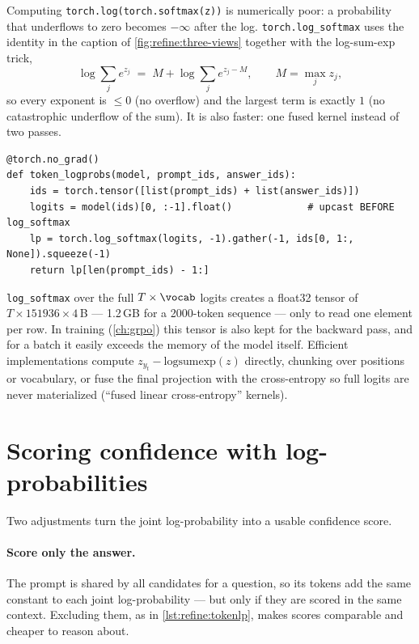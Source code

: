 Computing \texttt{torch.log(torch.softmax(z))} is numerically poor: a probability that underflows to
zero becomes $-\infty$ after the log. \texttt{torch.log\_softmax} uses the identity in the caption of
\cref{fig:refine:three-views} together with the log-sum-exp trick,
\begin{equation}
  \log \sum_j e^{z_j} \;=\; M + \log \sum_j e^{z_j - M}, \qquad M = \max_j z_j,
  \label{eq:refine:lse}
\end{equation}
so every exponent is $\le 0$ (no overflow) and the largest term is exactly $1$ (no catastrophic
underflow of the sum). It is also faster: one fused kernel instead of two passes.

\begin{lstlisting}[caption={Per-token log-probabilities in one pass (\texttt{llmsys/tts.py}).},label={lst:refine:tokenlp}]
@torch.no_grad()
def token_logprobs(model, prompt_ids, answer_ids):
    ids = torch.tensor([list(prompt_ids) + list(answer_ids)])
    logits = model(ids)[0, :-1].float()             # upcast BEFORE log_softmax
    lp = torch.log_softmax(logits, -1).gather(-1, ids[0, 1:, None]).squeeze(-1)
    return lp[len(prompt_ids) - 1:]
\end{lstlisting}

\begin{systemslens}
\texttt{log\_softmax} over the full $T \times \vocab$ logits creates a float32 tensor of
$T \times \num{151936} \times 4$\,B --- 1.2\,GB for a 2000-token sequence --- only to read one element
per row. In training (\cref{ch:grpo}) this tensor is also kept for the backward pass, and for a batch
it easily exceeds the memory of the model itself. Efficient implementations compute
$z_{y_t} - \mathrm{logsumexp}(z)$ directly, chunking over positions or vocabulary, or fuse the final
projection with the cross-entropy so full logits are never materialized (``fused linear
cross-entropy'' kernels).
\end{systemslens}

\section{Scoring confidence with log-probabilities}\label{sec:refine:confidence}

Two adjustments turn the joint log-probability into a usable confidence score.

\paragraph{Score only the answer.} The prompt is shared by all candidates for a question, so its
tokens add the same constant to each joint log-probability --- but only if they are scored in the
same context. Excluding them, as in \cref{lst:refine:tokenlp}, makes scores comparable and cheaper
to reason about.


